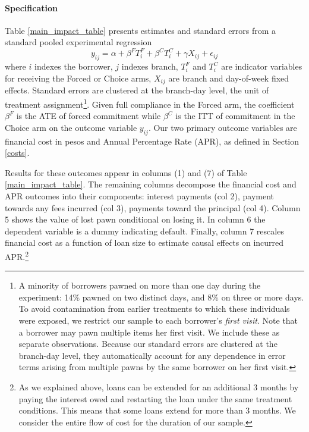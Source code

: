 \documentclass[12pt, a4paper]{article}
\begin{document}

\paragraph*{Specification} Table \ref{main_impact_table} presents estimates and standard errors from a standard pooled experimental regression 
\begin{equation} \label{basic_reg}
    y_{ij} = \alpha + \beta^F T_{i}^F + \beta^C T_{i}^C + \gamma X_{ij} + \epsilon_{ij}
\end{equation}
where $i$ indexes the borrower, $j$ indexes branch, $T_{i}^F$ and $T_{i}^C$ are indicator variables for receiving the Forced or Choice arms, $X_{ij}$ are branch and day-of-week fixed effects. Standard errors are clustered at the branch-day level, the unit of treatment assignment\footnote{A minority of borrowers pawned on more than one day during the experiment: 14\% pawned on two distinct days, and 8\% on three or more days. To avoid contamination from earlier treatments to which these individuals were exposed, we restrict our sample to each borrower's \emph{first visit}. Note that a borrower may pawn multiple items her first visit. We include these as separate observations. Because our standard errors are clustered at the branch-day level, they automatically account for any dependence in error terms arising from multiple pawns by the same borrower on her first visit.}.
Given full compliance in the Forced arm, the coefficient $\beta^F$ is the ATE of forced commitment while $\beta^C$ is the ITT of commitment in the Choice arm on the outcome variable $y_{ij}$.
Our two primary outcome variables are financial cost in pesos and Annual Percentage Rate (APR), as defined in Section \ref{costs}. 


Results for these outcomes appear in columns (1) and (7) of Table \ref{main_impact_table}.
The remaining columns decompose the financial cost and APR outcomes into their components: interest payments (col 2), payment towards any fees incurred (col 3), payments toward the principal (col 4). Column 5 shows the value of lost pawn conditional on losing it.  In column 6 the dependent variable is a dummy indicating default.  Finally, column 7 rescales financial cost as a function of loan size to estimate causal effects on incurred APR.\footnote{As we explained above, loans can be extended for an additional 3 months by paying the interest owed and restarting the loan under the same treatment conditions. This means that some loans extend for more than 3 months. We consider the entire flow of cost for the duration of our sample.}  
\end{document}
